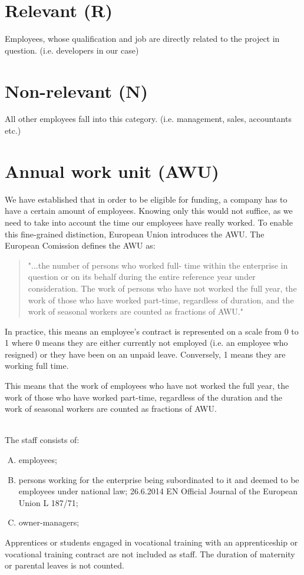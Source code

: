 \documentclass[12pt,oneside]{fithesis2}
\begin{document}
\section*{Relevant (R)}
Employees, whose qualification and job are directly related to the project in question. (i.e. developers in our case)\cite[page~30]{czech-rules}
\section*{Non-relevant (N)}
All other employees fall into this category. (i.e. management, sales, accountants etc.)\cite[page~30]{czech-rules}
\section{Annual work unit (AWU)}
We have established that in order to be eligible for funding, a company has to have a certain amount of employees. Knowing only this would not suffice, as we need to take into account the time our employees have really worked. To enable this fine-grained distinction, European Union introduces the AWU.
\newline\newline
The European Comission defines the AWU as:
\blockquote{"...the number of persons who worked full- time within the enterprise in question or on its behalf during the entire reference year under consideration. The work of persons who have not worked the full year, the work of those who have worked part-time, regardless of duration, and the work of seasonal workers are counted as fractions of AWU."\cite[page~71]{eu-commision-regulation}}
\newpage
In practice, this means an employee's contract is represented on a scale from 0 to 1 where 0 means they are either currently not employed (i.e. an employee who resigned) or they have been on an unpaid leave. Conversely, 1 means they are working full time.

This means that the work of employees who have not worked the full year, the work of those who have worked part-time, regardless of the duration and the work of seasonal workers are counted as fractions of AWU.

~\\\newline
The staff consists of:
\begin{enumerate}[A)]
    \item employees;
    \item persons working for the enterprise being subordinated to it and deemed to be employees under national law; 26.6.2014 EN Official Journal of the European Union L 187/71;
    \item owner-managers;
\end{enumerate}
Apprentices or students engaged in vocational training with an apprenticeship or vocational training contract are not included as staff. The duration of maternity or parental leaves is not counted. \cite{eu-commision-regulation}
\end{document}
